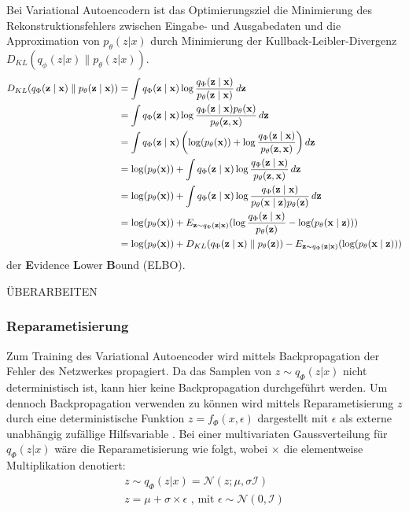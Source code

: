 \label{elbo}
Bei Variational Autoencodern ist das Optimierungsziel die Minimierung des Rekonstruktionsfehlers zwischen Eingabe- und Ausgabedaten und die Approximation von $p_\theta (z|x)$ durch Minimierung der Kullback-Leibler-Divergenz $D_{KL}(q_\phi (z|x) \parallel p_\theta (z|x) )$.
\begin{align*}
    \small
    D_{KL}(q_\Phi(\mathbf{z\mid x})\parallel p_\theta(\mathbf{z\mid x})) &= \int q_\Phi(\mathbf{z\mid x}) \log \frac{q_\Phi(\mathbf{z\mid x})}{p_\theta(\mathbf{z\mid x})} \, d\mathbf{z}\\
    &= \int q_\Phi(\mathbf{z\mid x}) \log \frac{q_\Phi(\mathbf{z\mid x})p_\theta(\mathbf{x})}{p_\theta(\mathbf{z,x})} \,d\mathbf{z}\\
    &= \int q_\Phi(\mathbf{z\mid x}) \left( \log (p_\theta(\mathbf{x})) + \log \frac{q_\Phi(\mathbf{z\mid x})}{p_\theta(\mathbf{z,x})}\right) d\mathbf{z}\\
    &= \log (p_\theta(\mathbf{x})) + \int q_\Phi(\mathbf{z\mid x}) \log \frac{q_\Phi(\mathbf{z\mid x})}{p_\theta(\mathbf{z,x})} \,d\mathbf{z}\\
    &= \log (p_\theta(\mathbf{x})) + \int q_\Phi(\mathbf{z\mid x}) \log \frac{q_\Phi(\mathbf{z\mid x})}{p_\theta(\mathbf{x\mid z})p_\theta(\mathbf{z})} \,d\mathbf{z}\\
    &= \log (p_\theta(\mathbf{x})) + E_{\mathbf{z} \sim q_\Phi(\mathbf{z\mid x})}(\log \frac{q_\Phi(\mathbf{z\mid x})}{p_\theta(\mathbf{z})} - \log(p_\theta(\mathbf{x\mid z})))\\
    &= \log (p_\theta(\mathbf{x})) + D_{KL}(q_\Phi(\mathbf{z\mid x}) \parallel p_\theta(\mathbf{z})) - E_{\mathbf{z} \sim q_\Phi(\mathbf{z\mid x})}(\log(p_\theta(\mathbf{x\mid z})))
    \end{align*}
der \textbf{E}vidence \textbf{L}ower \textbf{B}ound (ELBO).


ÜBERARBEITEN
\subsubsection{Reparametisierung} %
Zum Training des Variational Autoencoder wird mittels Backpropagation der Fehler des Netzwerkes propagiert. Da das Samplen von $z \sim q_\Phi(z|x)$ nicht deterministisch ist, kann hier keine Backpropagation durchgeführt werden.
Um dennoch Backpropagation verwenden zu können wird mittels Reparametisierung $z$ durch eine deterministische Funktion $z=f_\Phi(x,\epsilon)$ dargestellt mit $\epsilon$ als externe unabhängig zufällige Hilfsvariable \citep{kingma2014autoencoding,jordan_2018}. 
Bei einer multivariaten Gaussverteilung für $q_\Phi (z|x)$ wäre die Reparametisierung wie folgt, wobei $\times$ die elementweise Multiplikation denotiert:
\begin{align}
    z \sim q_\Phi(z|x) = \mathcal{N}(z;\mu,\sigma \mathcal{I}) \\
    z = \mu + \sigma \times \epsilon \text{ , mit } \epsilon \sim \mathcal{N}(0,\mathcal{I}) 
\end{align}


